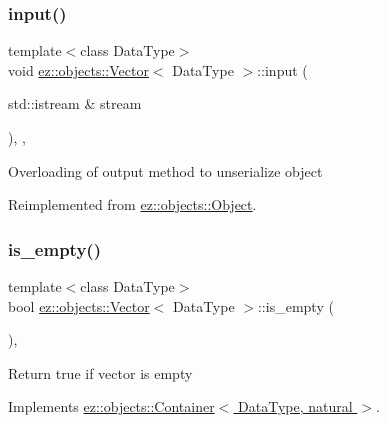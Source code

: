 \subsubsection{\texorpdfstring{input()}{input()}}
{\footnotesize\ttfamily template$<$class Data\+Type$>$ \\
void \hyperlink{classez_1_1objects_1_1Vector}{ez\+::objects\+::\+Vector}$<$ Data\+Type $>$\+::input (\begin{DoxyParamCaption}\item[{std\+::istream \&}]{stream }\end{DoxyParamCaption})\hspace{0.3cm}{\ttfamily [inline]}, {\ttfamily [override]}, {\ttfamily [virtual]}}

Overloading of output method to unserialize object 

Reimplemented from \hyperlink{classez_1_1objects_1_1Object_a878bdc53b7f16fda6fa15dab214c4b6a}{ez\+::objects\+::\+Object}.

\mbox{\label{classez_1_1objects_1_1Vector_a9fc4334b5da19dc41382f25b18c6e4bc}} 
\subsubsection{\texorpdfstring{is\+\_\+empty()}{is\_empty()}}
{\footnotesize\ttfamily template$<$class Data\+Type$>$ \\
bool \hyperlink{classez_1_1objects_1_1Vector}{ez\+::objects\+::\+Vector}$<$ Data\+Type $>$\+::is\+\_\+empty (\begin{DoxyParamCaption}{ }\end{DoxyParamCaption})\hspace{0.3cm}{\ttfamily [inline]}, {\ttfamily [virtual]}}

Return true if vector is empty 

Implements \hyperlink{classez_1_1objects_1_1Container_a205eb4f8a4fe967d425fdf04e5db5f93}{ez\+::objects\+::\+Container$<$ Data\+Type, natural $>$}.

\mbox{\label{classez_1_1objects_1_1Vector_a548b8f584d5272d19f267ea5585ad305}} 
